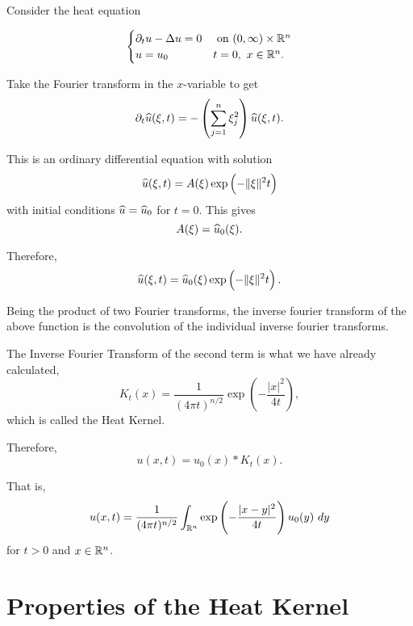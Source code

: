 Consider the heat equation 

\begin{equation*}
    \begin{cases}
        \partial_t u - \Delta u = 0 & \text{ on } (0,\infty)\times\mathbb{R}^n\\
        u = u_0 & t = 0,~x\in\mathbb{R}^n.
    \end{cases}
\end{equation*}

Take the Fourier transform in the $x$-variable to get 
\begin{equation*}
    \partial_t\widehat{u}(\xi, t) = -\left(\sum_{j = 1}^n\xi_j^2\right)\widehat{u}(\xi, t).
\end{equation*}

This is an ordinary differential equation with solution 
\begin{equation*}
    \widehat{u}(\xi, t) = A(\xi)\exp\left(-\|\xi\|^2 t\right)
\end{equation*}
with initial conditions $\widehat{u} = \widehat{u}_0$ for $t = 0$. This gives 
\begin{equation*}
    A(\xi) = \widehat{u}_0(\xi).
\end{equation*}

Therefore, 
\begin{equation*}
    \widehat{u}(\xi, t) = \widehat{u}_0(\xi)\exp\left(-\|\xi\|^2t\right).
\end{equation*}

Being the product of two Fourier transforms, the inverse fourier transform of the above function is the convolution of the individual inverse fourier transforms. 

The Inverse Fourier Transform of the second term is what we have already calculated, 
\begin{equation*}
    K_t(x) = \frac{1}{(4\pi t)^{n/2}}\exp\left(-\frac{|x|^2}{4t}\right),
\end{equation*}
which is called the Heat Kernel.

Therefore, 
\begin{equation*}
    u(x, t) = u_0(x)\ast K_t(x).
\end{equation*}

That is, 
\begin{equation*}
    u(x, t) = \frac{1}{(4\pi t)^{n/2}}\int_{\mathbb{R}^n}\exp\left(-\frac{|x - y|^2}{4t}\right)u_0(y)~dy
\end{equation*}
for $t > 0$ and $x\in\mathbb{R}^n$.

\section*{Properties of the Heat Kernel}

